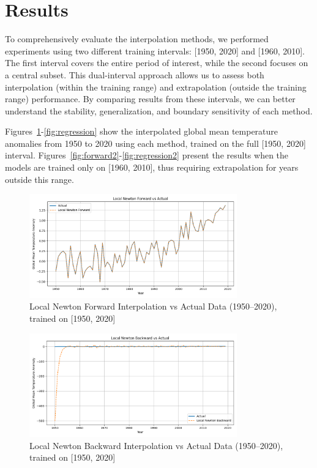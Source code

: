 \section{Results}

To comprehensively evaluate the interpolation methods, we performed experiments using two different training intervals: [1950, 2020] and [1960, 2010]. The first interval covers the entire period of interest, while the second focuses on a central subset. This dual-interval approach allows us to assess both interpolation (within the training range) and extrapolation (outside the training range) performance. By comparing results from these intervals, we can better understand the stability, generalization, and boundary sensitivity of each method.

Figures~\ref{fig:forward}-\ref{fig:regression} show the interpolated global mean temperature anomalies from 1950 to 2020 using each method, trained on the full [1950, 2020] interval. Figures~\ref{fig:forward2}-\ref{fig:regression2} present the results when the models are trained only on [1960, 2010], thus requiring extrapolation for years outside this range.

\begin{figure}[htbp]
    \centering
    \includegraphics[width=0.8\textwidth]{../figs/Local_Newton_Forward_vs_actual[1950, 2020, 1].png}
    \caption{Local Newton Forward Interpolation vs Actual Data (1950--2020), trained on [1950, 2020]}
    \label{fig:forward}
\end{figure}

\begin{figure}[htbp]
    \centering
    \includegraphics[width=0.8\textwidth]{../figs/Local_Newton_Backward_vs_actual[1950, 2020, 1].png}
    \caption{Local Newton Backward Interpolation vs Actual Data (1950--2020), trained on [1950, 2020]}
    \label{fig:backward}
\end{figure}

